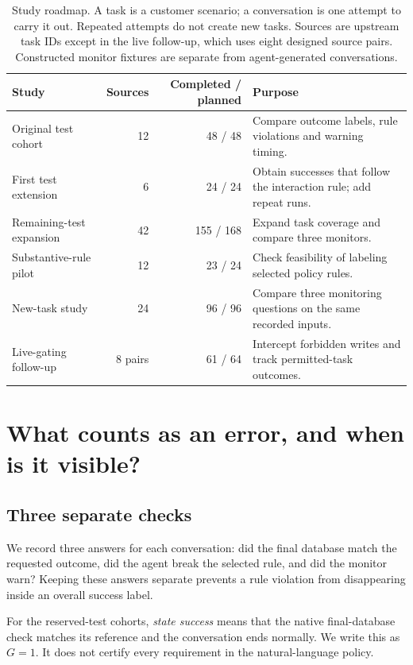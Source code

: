 \documentclass[10pt]{article}
\begin{document}
\begin{table}[t]
\centering\small
\caption{Study roadmap. A task is a customer scenario; a conversation is one attempt to carry it out. Repeated attempts do not create new tasks. Sources are upstream task IDs except in the live follow-up, which uses eight designed source pairs. Constructed monitor fixtures are separate from agent-generated conversations.}
\label{tab:roadmap}
\setlength{\tabcolsep}{4pt}
\begin{tabular}{p{.21\linewidth}rrp{.41\linewidth}}
\toprule
Study & Sources & Completed / planned & Purpose\\
\midrule
Original test cohort & 12 & 48 / 48 & Compare outcome labels, rule violations and warning timing.\\
First test extension & 6 & 24 / 24 & Obtain successes that follow the interaction rule; add repeat runs.\\
Remaining-test expansion & 42 & 155 / 168 & Expand task coverage and compare three monitors.\\
Substantive-rule pilot & 12 & 23 / 24 & Check feasibility of labeling selected policy rules.\\
New-task study & 24 & 96 / 96 & Compare three monitoring questions on the same recorded inputs.\\
Live-gating follow-up & 8 pairs & 61 / 64 & Intercept forbidden writes and track permitted-task outcomes.\\
\bottomrule
\end{tabular}
\end{table}

\section{What counts as an error, and when is it visible?}
\label{sec:targets}
\subsection{Three separate checks}
We record three answers for each conversation: did the final database match the requested outcome, did the agent break the selected rule, and did the monitor warn? Keeping these answers separate prevents a rule violation from disappearing inside an overall success label.

For the reserved-test cohorts, \emph{state success} means that the native final-database check matches its reference and the conversation ends normally. We write this as $G=1$. It does not certify every requirement in the natural-language policy.
\end{document}
